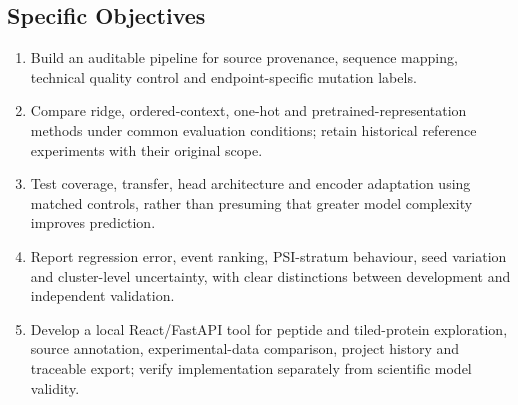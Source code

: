 \subsection{Specific Objectives}
\begin{enumerate}
  \item Build an auditable pipeline for source provenance, sequence mapping, technical quality control
        and endpoint-specific mutation labels.
  \item Compare ridge, ordered-context, one-hot and pretrained-representation methods under common
        evaluation conditions; retain historical reference experiments with their original scope.
  \item Test coverage, transfer, head architecture and encoder adaptation using matched controls,
        rather than presuming that greater model complexity improves prediction.
  \item Report regression error, event ranking, PSI-stratum behaviour, seed variation and cluster-level
        uncertainty, with clear distinctions between development and independent validation.
  \item Develop a local React/FastAPI tool for peptide and tiled-protein exploration, source annotation,
        experimental-data comparison, project history and traceable export; verify implementation
        separately from scientific model validity.
\end{enumerate}

